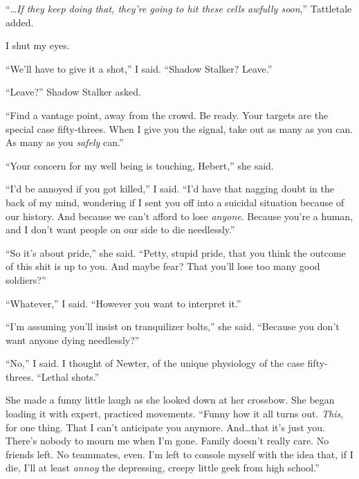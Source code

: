 ``\ldots\emph{If they keep doing that, they're going to hit these cells awfully soon},'' Tattletale added.



I shut my eyes.



``We'll have to give it a shot,'' I said.  ``Shadow Stalker?  Leave.''



``Leave?''  Shadow Stalker asked.



``Find a vantage point, away from the crowd.  Be ready.  Your targets are the special case fifty-threes.  When I give you the signal, take out as many as you can.  As many as you \emph{safely} can.''



``Your concern for my well being is touching, Hebert,'' she said.



``I'd be annoyed if you got killed,'' I said.  ``I'd have that nagging doubt in the back of my mind, wondering if I sent you off into a suicidal situation because of our history.  And because we can't afford to lose \emph{anyone}.  Because you're a human, and I don't want people on our side to die needlessly.''



``So it's about pride,'' she said.  ``Petty, stupid pride, that you think the outcome of this shit is up to you.  And maybe fear?  That you'll lose too many good soldiers?''



``Whatever,'' I said.  ``However you want to interpret it.''



``I'm assuming you'll insist on tranquilizer bolts,'' she said.  ``Because you don't want anyone dying needlessly?''



``No,'' I said.  I thought of Newter, of the unique physiology of the case fifty-threes.  ``Lethal shots.''



She made a funny little laugh as she looked down at her crossbow.  She began loading it with expert, practiced movements.  ``Funny how it all turns out.  \emph{This}, for one thing.  That I can't anticipate you anymore.  And\ldots that it's just you.  There's nobody to mourn me when I'm gone.  Family doesn't really care.  No friends left.  No teammates, even.  I'm left to console myself with the idea that, if I die, I'll at least \emph{annoy} the depressing, creepy little geek from high school.''



